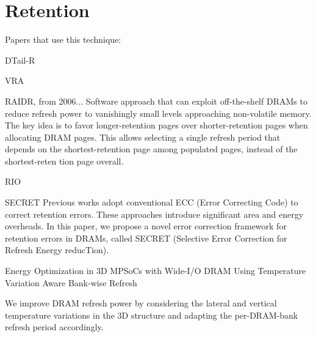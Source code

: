 \section{Retention}
\label{sec:ret}
Papers that use this technique:

DTail-R\cite{dtail}

VRA

RAIDR\cite{raidr}, from 2006...
Software approach that can exploit off-the-shelf DRAMs to reduce refresh power to vanishingly
small levels approaching non-volatile memory. The key idea is to favor longer-retention pages over shorter-retention pages when allocating DRAM pages. This allows selecting a single refresh period that depends on the shortest-retention page among populated pages,
instead of the shortest-reten tion page overall. 

RIO\cite{rioparis}

SECRET\cite{secret}
Previous works adopt conventional ECC (Error Correcting Code) to correct retention errors. These approaches introduce significant area and energy overheads. In this paper, we propose a novel error correction framework for retention errors in DRAMs, called SECRET (Selective Error Correction for Refresh Energy reducTion).

Energy Optimization in 3D MPSoCs with Wide-I/O DRAM Using Temperature Variation Aware Bank-wise Refresh

We improve DRAM refresh power by considering the lateral and vertical temperature
variations in the 3D structure and adapting the per-DRAM-bank refresh period accordingly.